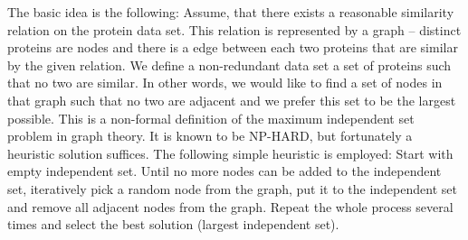 \documentclass[11pt,twoside,a4paper]{book}
\begin{document}
The basic idea is the following: 
Assume, that there exists a reasonable similarity relation on the protein data set. 
This relation is represented by a graph -- distinct proteins are nodes and there
is a edge between each two proteins that are similar by the given relation.
We define a non-redundant data set a set of proteins such that no two are similar.
In other words, we would like to find a set of nodes in that graph such that no two are adjacent
and we prefer this set to be the largest possible.
This is a non-formal definition of the maximum independent set problem in graph theory.
It is known to be NP-HARD, but fortunately a heuristic solution suffices.
The following simple heuristic is employed:
Start with empty independent set.
Until no more nodes can be added to the independent set,
iteratively pick a random node from the graph,
put it to the independent set and remove all adjacent nodes from the graph.
Repeat the whole process several times and select the best solution (largest independent set).
\end{document}
